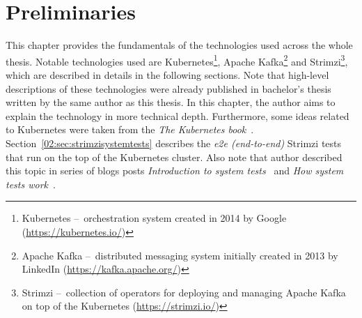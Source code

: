 \chapter{Preliminaries}
\label{02:chapter:title}

This chapter provides the fundamentals of the technologies used across the whole thesis.
Notable technologies used are Kubernetes\footnote{Kubernetes \---\ orchestration system created in 2014 by Google (\url{https://kubernetes.io/})}, Apache Kafka\footnote{Apache Kafka \---\ distributed messaging system initially created in 2013 by LinkedIn (\url{https://kafka.apache.org/})} and Strimzi\footnote{Strimzi \---\ collection of operators for deploying and managing Apache Kafka on top of the Kubernetes (\url{https://strimzi.io/})}, which are described in details in the following sections.
Note that high-level descriptions of these technologies were already published in bachelor's thesis~\cite{02-bachelor-thesis} written by the same author as this thesis.
In this chapter, the author aims to explain the technology in more technical depth.
Furthermore, some ideas related to Kubernetes were taken from the \emph{The Kubernetes book}~\cite{kubernetesBook}.
Section~\ref{02:sec:strimzisystemtests} describes the \emph{e2e (end-to-end)}  Strimzi tests that run on the top of the Kubernetes cluster.
Also note that author described this topic in series of blogs posts \emph{Introduction to system tests}~\cite{02-blogpost-introduction-to-systemtest} and \emph{How system tests work}~\cite{02-blogpost-how-systemtest-work}.
